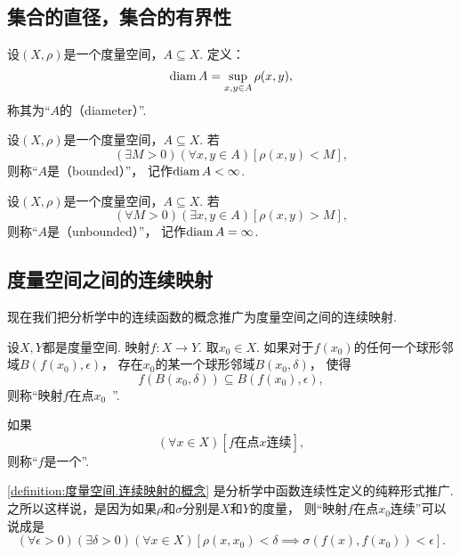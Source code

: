 \subsection{集合的直径，集合的有界性}
\begin{definition}
设\((X,\rho)\)是一个度量空间，\(A \subseteq X\).
定义：\begin{equation*}
	\operatorname{diam} A = \sup_{x,y \in A} \rho(x,y),
\end{equation*}
称其为“\(A\)的（diameter）”.
\end{definition}
\begin{definition}
设\((X,\rho)\)是一个度量空间，\(A \subseteq X\).
若\begin{equation*}
	(\exists M>0)
	(\forall x,y \in A)
	[\rho(x,y) < M],
\end{equation*}
则称“\(A\)是（bounded）”，
记作\(\operatorname{diam} A < \infty\).
\end{definition}
\begin{definition}
设\((X,\rho)\)是一个度量空间，\(A \subseteq X\).
若\begin{equation*}
	(\forall M>0)
	(\exists x,y \in A)
	[\rho(x,y) > M],
\end{equation*}
则称“\(A\)是（unbounded）”，
记作\(\operatorname{diam} A = \infty\).
\end{definition}

\subsection{度量空间之间的连续映射}
现在我们把分析学中的连续函数的概念推广为度量空间之间的连续映射.

\begin{definition}\label{definition:度量空间.连续映射的概念}
设\(X,Y\)都是度量空间.
映射\(f\colon X \to Y\).
取\(x_0 \in X\).
如果对于\(f(x_0)\)的任何一个球形邻域\(B(f(x_0),\epsilon)\)，
存在\(x_0\)的某一个球形邻域\(B(x_0,\delta)\)，
使得\begin{equation*}
	f(B(x_0,\delta))
	\subseteq
	B(f(x_0),\epsilon),
\end{equation*}
则称“映射\(f\)在点\(x_0\)~”.

如果\begin{equation*}
	(\forall x \in X)
	[\text{\(f\)在点\(x\)连续}],
\end{equation*}
则称“\(f\)是一个”.
\end{definition}
\cref{definition:度量空间.连续映射的概念} 是分析学中函数连续性定义的纯粹形式推广.
之所以这样说，是因为如果\(\rho\)和\(\sigma\)分别是\(X\)和\(Y\)的度量，
则“映射\(f\)在点\(x_0\)连续”可以说成是\begin{equation*}
	(\forall\epsilon>0)
	(\exists\delta>0)
	(\forall x \in X)
	[
		\rho(x,x_0)<\delta
		\implies
		\sigma(f(x),f(x_0))<\epsilon
	].
\end{equation*}

